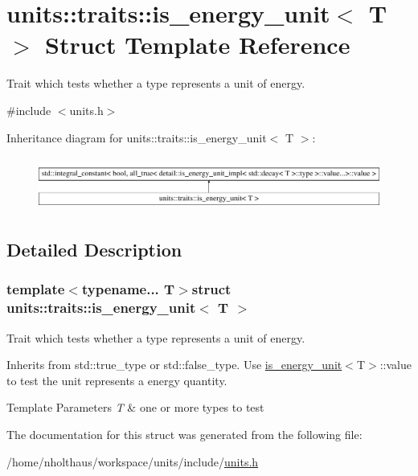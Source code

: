 \hypertarget{structunits_1_1traits_1_1is__energy__unit}{}\section{units\+:\+:traits\+:\+:is\+\_\+energy\+\_\+unit$<$ T $>$ Struct Template Reference}
\label{structunits_1_1traits_1_1is__energy__unit}


Trait which tests whether a type represents a unit of energy.  




{\ttfamily \#include $<$units.\+h$>$}

Inheritance diagram for units\+:\+:traits\+:\+:is\+\_\+energy\+\_\+unit$<$ T $>$\+:\begin{figure}[H]
\begin{center}
\leavevmode
\includegraphics[height=1.772152cm]{structunits_1_1traits_1_1is__energy__unit}
\end{center}
\end{figure}


\subsection{Detailed Description}
\subsubsection*{template$<$typename... T$>$struct units\+::traits\+::is\+\_\+energy\+\_\+unit$<$ T $>$}

Trait which tests whether a type represents a unit of energy. 

Inherits from {\ttfamily std\+::true\+\_\+type} or {\ttfamily std\+::false\+\_\+type}. Use {\ttfamily \hyperlink{structunits_1_1traits_1_1is__energy__unit}{is\+\_\+energy\+\_\+unit}$<$T$>$\+::value} to test the unit represents a energy quantity. 
\begin{DoxyTemplParams}{Template Parameters}
{\em T} & one or more types to test \\
\hline
\end{DoxyTemplParams}


The documentation for this struct was generated from the following file\+:\begin{DoxyCompactItemize}
\item 
/home/nholthaus/workspace/units/include/\hyperlink{units_8h}{units.\+h}\end{DoxyCompactItemize}
